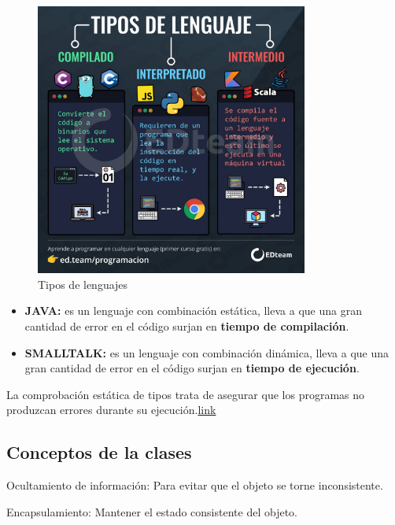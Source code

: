 \documentclass[../main.tex]{subfiles}
\begin{document}
        \begin{figure}[h]
            \centering
            \includegraphics[width=0.8\textwidth]{../images/lenguajes.jpeg}
            \caption{Tipos de lenguajes}
            \label{fig:tipos_lenguajes}
        \end{figure}

        \begin{itemize}
            \item \textbf{JAVA:} es un lenguaje con combinación estática, lleva a que una gran cantidad de error en el código surjan en \textbf{tiempo de compilación}.
            \item \textbf{SMALLTALK:} es un lenguaje con combinación dinámica, lleva a que una gran cantidad de error en el código surjan en \textbf{tiempo de ejecución}.
        \end{itemize}

        La comprobación estática de tipos trata de asegurar que los programas no produzcan errores durante su ejecución.\href{https://babel.ls.fi.upm.es/prole2013/miguel_garcia_rodriguez.pdf}{link}


    \subsection{Conceptos de la clases}
        Ocultamiento de información: Para evitar que el objeto se torne inconsistente.

        Encapsulamiento: Mantener el estado consistente del objeto.
\end{document}
